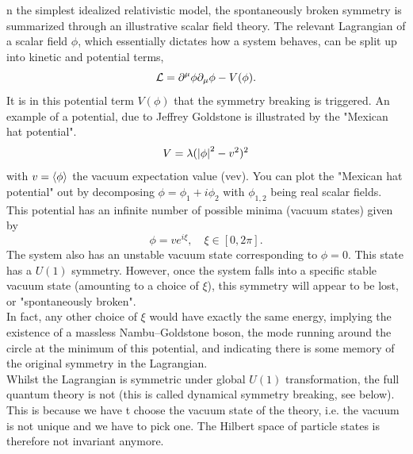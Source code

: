n the simplest idealized relativistic model, the spontaneously broken symmetry is summarized through an illustrative scalar field theory. The relevant Lagrangian of a scalar field $\phi$, which essentially dictates how a system behaves, can be split up into kinetic and potential terms,
\begin{equation}
	\mathcal{L} = \partial^\mu \phi \partial_\mu \phi - V(\phi).
\end{equation}
It is in this potential term $V(\phi)$ that the symmetry breaking is triggered. An example of a potential, due to Jeffrey Goldstone is illustrated by the "Mexican hat potential".
\begin{equation}
	V=\lambda ( \abs{\phi}^2 - v^2)^2
\end{equation}
with $v = \expval{\phi}$ the vacuum expectation value (vev). You can plot the "Mexican hat potential" out by decomposing $\phi=\phi_1 + i \phi_2$ with $\phi_{1,2}$ being real scalar fields.
This potential has an infinite number of possible minima (vacuum states) given by
\begin{equation}
\phi = v e^{i \xi} ,\quad \xi \in [0,2\pi].
\end{equation}
The system also has an unstable vacuum state corresponding to $\phi = 0$. This state has a $U(1)$ symmetry. However, once the system falls into a specific stable vacuum state (amounting to a choice of $\xi$), this symmetry will appear to be lost, or "spontaneously broken".
\\
In fact, any other choice of $\xi$ would have exactly the same energy, implying the existence of a massless Nambu–Goldstone boson, the mode running around the circle at the minimum of this potential, and indicating there is some memory of the original symmetry in the Lagrangian.\\
Whilst the Lagrangian is symmetric under global $U(1)$ transformation, the full quantum theory is not (this is called dynamical symmetry breaking, see below).  This is because we have t choose the vacuum state of the theory, i.e. the vacuum is not unique and we have to pick one. The Hilbert space of particle states is therefore not invariant anymore.
